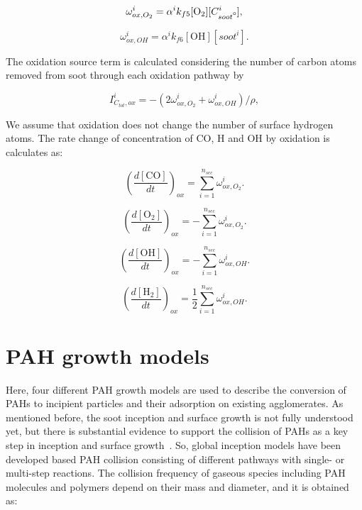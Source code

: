 \begin{equation}
	\omega^i_{ox,O_2} = \alpha^i k_{f5} [\mathrm{O_2}][C^i_{soot\mbox{\textdegree}}]
	\label{eqn:hacaO2Rate},
\end{equation}

\begin{equation}
	\omega^i_{ox,OH} = \alpha^i k_{f6} [\mathrm{OH}][soot^i]
	\label{eqn:hacaOHRate}.
\end{equation}

The oxidation source term is calculated considering the number of carbon atoms removed from soot through each oxidation pathway by

\begin{equation}
	I^i_{C_{tot},ox} = -(2\omega^i_{ox,O_2} + \omega^i_{ox,OH})/\rho
	\label{eqn:ICtot},
\end{equation}

We assume that oxidation does not change the number of surface hydrogen atoms. The rate change of concentration of CO, H and OH by oxidation is calculates as:

\begin{equation}
	\left(\frac{d\left[{\mathrm{CO}}\right]}{dt}\right)_{ox} = \sum_{i=1}^{n_{sec}}\omega^i_{ox,O_2}
	\label{eqn:COrate_ox}.
\end{equation}

\begin{equation}
	\left(\frac{d\left[{\mathrm{O_2}}\right]}{dt}\right)_{ox} = -\sum_{i=1}^{n_{sec}}\omega^i_{ox,O_2}
	\label{eqn:COrate_ox}.
\end{equation}

\begin{equation}
	\left(\frac{d\left[{\mathrm{OH}}\right]}{dt}\right)_{ox} = -\sum_{i=1}^{n_{sec}}\omega^i_{ox,OH}
	\label{eqn:Hrate_ox}.
\end{equation}

\begin{equation}
	\left(\frac{d\left[{\mathrm{H_2}}\right]}{dt}\right)_{ox} = \frac{1}{2}\sum_{i=1}^{n_{sec}}\omega^i_{ox,OH}
	\label{eqn:OHrate_ox}.
\end{equation}

\section{PAH growth models}
\label{sec:pahgrowmodel}
Here, four different PAH growth models are used to describe the conversion of PAHs to incipient particles and their adsorption on existing agglomerates. As mentioned before, the soot inception and surface growth is not fully understood yet, but there is substantial evidence to support the collision of PAHs as a key step in inception and surface growth~\citep{zhao2003measurement, abid2009quantitative, happold2009soot}. So, global inception models have been developed based PAH collision consisting of different pathways with single- or multi-step reactions. The collision frequency of gaseous species including PAH molecules and polymers depend on their mass and diameter, and it is obtained as:


